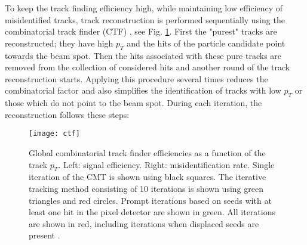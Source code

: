 To keep the track finding efficiency high, while maintaining low efficiency of misidentified tracks, track reconstruction is performed sequentially using the combinatorial track finder (CTF) \cite{combined_track_finding}, see Fig. \ref{ctf}. First the "purest" tracks are reconstructed; they have high $p_T$ and the hits of the particle candidate point towards the beam spot. Then the hits associated with these pure tracks are removed from the collection of considered hits and another round of the track reconstruction starts. Applying this procedure several times reduces the combinatorial factor and also simplifies the identification of tracks with low $p_T$ or those which do not point to the beam spot. During each iteration, the reconstruction follows these steps:


 \begin{figure}[H]
  \centering
  \texttt{[image: ctf]}
  \caption[Global combinatorial track finder efficiencies. ]{Global combinatorial track finder efficiencies as a function of the track $p_T$. Left: signal efficiency. Right:  misidentification rate. Single iteration of the CMT is shown using black squares. The iterative tracking method consisting of 10 iterations is shown using green triangles and red circles. Prompt iterations based on seeds with at least one hit in the pixel detector are shown in green. All iterations are shown in red, including iterations when displaced seeds are present \cite{PFalgo}.  }\label{ctf}
\end{figure}


